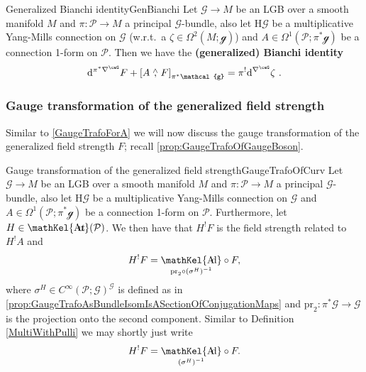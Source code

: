 \documentclass[reqno,a4paper,oneside]{amsart}
\theoremstyle{plain}
\theoremstyle{remark}
\theoremstyle{definition}
\DeclareMathOperator{\sAut}{\mathKel{A\mkern-5.5mu u\mkern-4mu t\mkern-1.5mu}}
\DeclareMathOperator{\sAd}{\mathKel{A\mkern-5.5mu d}}
\begin{document}
\begin{lemmata}{Generalized Bianchi identity}{GenBianchi}
Let $\mathcal{G} \to M$ be an LGB over a smooth manifold $M$ and $\pi\colon\mathcal{P} \to M$ a principal $\mathcal{G}$-bundle, also let $\mathrm{H}\mathcal{G}$ be a multiplicative Yang-Mills connection on $\mathcal{G}$ (w.r.t.\ a $\zeta \in \Omega^2(M; \mathcal{g})$) and $A \in \Omega^1(\mathcal{P}; \pi^*\mathcal{g})$ be a connection 1-form on $\mathcal{P}$. Then we have the \textbf{(generalized) Bianchi identity}
\begin{equation*}
\mathrm{d}^{\pi^*\nabla^\caG}F
	+ \mleft[ A \stackrel{\wedge}{,} F \mright]_{\pi^*\mathcal{g}}
=
\pi^! \mathrm{d}^{\nabla^\caG} \zeta~.
\end{equation*}
\end{lemmata}

\subsubsection{Gauge transformation of the generalized field strength}

Similar to \ref{GaugeTrafoForA} we will now discuss the gauge transformation of the generalized field strength $F$; recall \ref{prop:GaugeTrafoOfGaugeBoson}.

\begin{propositions}{Gauge transformation of the generalized field strength}{GaugeTrafoOfCurv}
Let $\mathcal{G} \to M$ be an LGB over a smooth manifold $M$ and $\pi\colon\mathcal{P} \to M$ a principal $\mathcal{G}$-bundle, also let $\mathrm{H}\mathcal{G}$ be a multiplicative Yang-Mills connection on $\mathcal{G}$ and $A \in \Omega^1(\mathcal{P}; \pi^*\mathcal{g})$ be a connection 1-form on $\mathcal{P}$. Furthermore, let $H \in \sAut(\mathcal{P})$. We then have that $H^!F$ is the field strength related to $H^!A$ and
\begin{equation*}
H^!F
=
{\sAd_{\mathrm{pr}_2\circ\mleft(\sigma^H\mright)^{-1}}} \circ F,
\end{equation*}
where $\sigma^H \in C^\infty(\mathcal{P}; \mathcal{G})^{\mathcal{G}}$ is defined as in \ref{prop:GaugeTrafoAsBundleIsomIsASectionOfConjugationMaps} and $\mathrm{pr}_2\colon \pi^*\mathcal{G} \to \mathcal{G}$ is the projection onto the second component. Similar to Definition \eqref{MultiWithPulli} we may shortly just write 
\begin{equation*}
H^!F
=
{\sAd_{\mleft(\sigma^H\mright)^{-1}}} \circ F.
\end{equation*}
\end{propositions}
\end{document}
